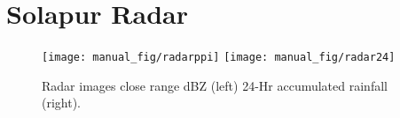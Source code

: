 \documentclass[10pt,usletter]{article} %
\begin{document}
\section{Solapur Radar}
\begin{figure}[H]
\centering
\texttt{[image: manual\_fig/radarppi]}
\texttt{[image: manual\_fig/radar24]}
\caption{Radar images close range dBZ (left) 24-Hr accumulated rainfall (right).}
\end{figure}







\end{document}
